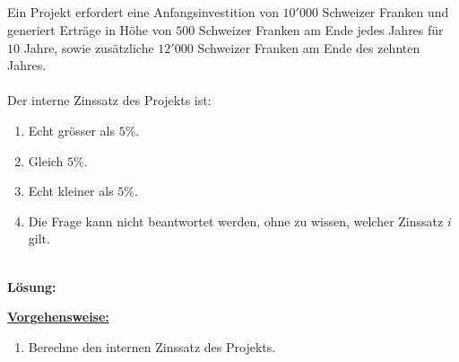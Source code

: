 \subsection*{}
Ein Projekt erfordert eine Anfangsinvestition von $10'000$ Schweizer Franken und generiert Erträge in Höhe von $500$ Schweizer Franken am Ende jedes Jahres für $10$ Jahre, sowie zusätzliche $12'000$ Schweizer Franken am Ende des zehnten Jahres.\\
\\
Der interne Zinssatz des Projekts ist:
\renewcommand{\labelenumi}{(\alph{enumi})}
\begin{enumerate}
	\item 
	Echt grösser als $5 \%$.
	\item 
	Gleich $5 \%$.
	\item
	Echt kleiner als $5 \%$.
	\item
	Die Frage kann nicht beantwortet werden, ohne zu wissen, welcher Zinssatz $i$ gilt.
\end{enumerate}
\ \\
\textbf{Lösung:}
\begin{mdframed}
\underline{\textbf{Vorgehensweise:}}
\renewcommand{\labelenumi}{\theenumi.}
\begin{enumerate}
\item Berechne den internen Zinssatz des Projekts.
\end{enumerate}
\end{mdframed}

